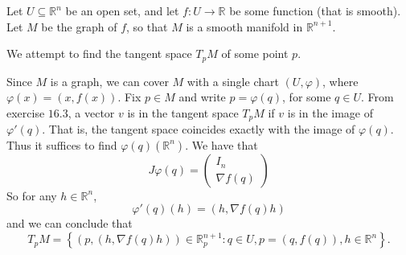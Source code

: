 \documentclass{article}
\theoremstyle{plain} %
\numberwithin{thm}{section} %
\theoremstyle{definition}
\begin{document}
    \medskip

    Let \(U \subseteq \mathbb{R}^n\) be an open set, and let \(f: U \to \mathbb{R}\) be some function (that is smooth). Let \(M\) be the graph of \(f\), so that \(M\) is a smooth manifold in \(\mathbb{R}^{n+1}\).

    We attempt to find the tangent space \(T_p M\) of some point \(p\).

    Since \(M\) is a graph, we can cover \(M\) with a single chart \((U, \varphi)\), where \(\varphi (x) = (x, f(x))\). Fix \(p \in M\) and write \(p = \varphi (q)\), for some \(q \in U\). From exercise \(16.3\), a vector \(v\) is in the tangent space \(T_p M\) if \(v\) is in the image of \(\varphi '(q)\). That is, the tangent space coincides exactly with the image of \(\varphi (q)\). Thus it suffices to find \(\varphi (q)(\mathbb{R}^{n})\). We have that
    \[
        J \varphi (q) = \left( \begin{array}{c}
            I_n \\
            \hline
            \nabla f(q)
        \end{array} \right) 
    \]
    So for any \(h \in \mathbb{R}^n\),
    \[
        \varphi '(q)(h) = (h, \nabla f(q)h)
    \]
    and we can conclude that
    \[
        T_p M = \left\{ (p, (h, \nabla f(q)h)) \in \mathbb{R}^{n+1}_p : q \in U, p = (q, f(q)), h \in \mathbb{R}^n \right\}.
    \]
\end{document}

